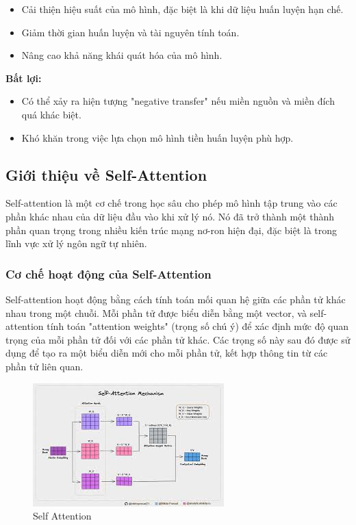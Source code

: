 \begin{itemize}
    \item Cải thiện hiệu suất của mô hình, đặc biệt là khi dữ liệu huấn luyện hạn chế.
    \item Giảm thời gian huấn luyện và tài nguyên tính toán.
    \item Nâng cao khả năng khái quát hóa của mô hình.
\end{itemize}

\textbf{Bất lợi:}

\begin{itemize}
    \item Có thể xảy ra hiện tượng "negative transfer" nếu miền nguồn và miền đích quá khác biệt.
    \item Khó khăn trong việc lựa chọn mô hình tiền huấn luyện phù hợp.
\end{itemize}
\subsection{Giới thiệu về Self-Attention}

Self-attention là một cơ chế trong học sâu cho phép mô hình tập trung vào các phần khác nhau của dữ liệu đầu vào khi xử lý nó. Nó đã trở thành một thành phần quan trọng trong nhiều kiến trúc mạng nơ-ron hiện đại, đặc biệt là trong lĩnh vực xử lý ngôn ngữ tự nhiên.

\subsubsection{Cơ chế hoạt động của Self-Attention}

Self-attention hoạt động bằng cách tính toán mối quan hệ giữa các phần tử khác nhau trong một chuỗi. Mỗi phần tử được biểu diễn bằng một vector, và self-attention tính toán "attention weights" (trọng số chú ý) để xác định mức độ quan trọng của mỗi phần tử đối với các phần tử khác. Các trọng số này sau đó được sử dụng để tạo ra một biểu diễn mới cho mỗi phần tử, kết hợp thông tin từ các phần tử liên quan.


 \begin{figure}[H]
    \centering
    \includegraphics[scale = 0.2]{Images/Theoretical basis/self-attention.jpg}
\caption{Self Attention}
\end{figure}

